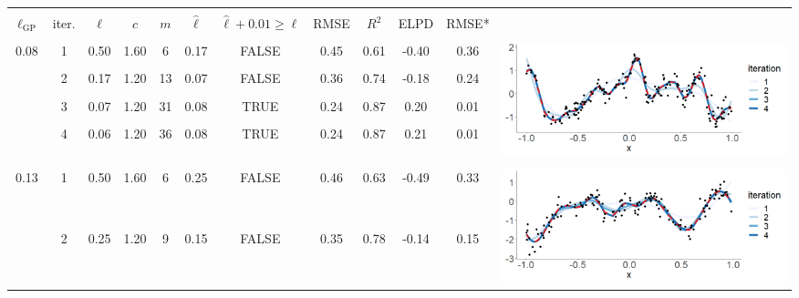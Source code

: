 \begin{table}
\centering
\setlength{\tabcolsep}{4pt}
\begin{tabular}{ c c c c c c c c c c | c c}
\arrayrulecolor{gray}\hline \\[-3mm]
$\ell_{\text{GP}}$ & iter. & $\ell$ & $c$ & $m$ & $\hat{\ell}$ & $\hat{\ell} + 0.01 \geq \ell$ & RMSE & $R^2$ & ELPD & RMSE* & \\ 
\arrayrulecolor{lightgray}\hline \\[-1mm]
\multirow{4}{*}{ 0.08} 
 & 1 & 0.50 & 1.60 & 6 & 0.17 & FALSE & 0.45 & 0.61 & -0.40 & 0.36 & \multirow{6}{*}{ \includegraphics[scale=0.25, trim = 0mm 10mm 0mm 5mm, clip]{tab1_diagnostic_2.png}}\\
 & 2 & 0.17 & 1.20 & 13 & 0.07 & FALSE & 0.36 & 0.74 & -0.18 & 0.24 & \\
 & 3 & 0.07 & 1.20 & 31 & 0.08 & TRUE & 0.24 & 0.87 & 0.20 & 0.01 & \\
 & 4 & 0.06 & 1.20 & 36 & 0.08 & TRUE & 0.24 & 0.87 & 0.21 & 0.01 & \\
 \\
 \\[1mm]
 \arrayrulecolor{lightgray}\hline \\[-1mm]
\multirow{4}{*}{ 0.13} 
 & 1 & 0.50 & 1.60 & 6 & 0.25 & FALSE & 0.46 & 0.63 & -0.49 & 0.33 & \multirow{6}{*}{ \includegraphics[scale=0.25, trim = 0mm 10mm 0mm 5mm, clip]{tab1_diagnostic_3.png}}\\
 & 2 & 0.25 & 1.20 & 9 & 0.15 & FALSE & 0.35 & 0.78 & -0.14 & 0.15 & \\

\end{tabular}
\end{table}
